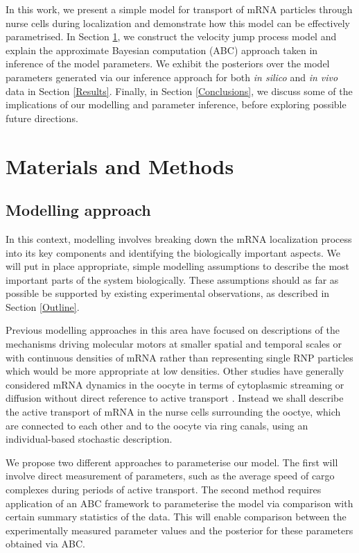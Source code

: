\documentclass[twocolumn]{biophys}
\begin{document}
In this work, we present a simple model for transport of mRNA particles through nurse cells during localization and demonstrate how this model can be effectively parametrised.
In Section \ref{Methods}, we construct the velocity jump process model and explain the approximate Bayesian computation (ABC) approach taken in inference of the model parameters.
We exhibit the posteriors over the model parameters generated via our inference approach for both \textit{in silico} and \textit{in vivo} data in Section \ref{Results}.
Finally, in Section \ref{Conclusions}, we discuss some of the implications of our modelling and parameter inference, before exploring possible future directions.

\section{Materials and Methods} \label{Methods}
\subsection{Modelling approach} \label{Modelling}
In this context, modelling involves breaking down the mRNA localization process into its key components and identifying the biologically important aspects. 
We will put in place appropriate, simple modelling assumptions to describe the most important parts of the system biologically.
These assumptions should as far as possible be supported by existing experimental observations, as described in Section \ref{Outline}.

Previous modelling approaches in this area have focused on descriptions of the mechanisms driving molecular motors at smaller spatial and temporal scales \citep{bressloff2013stochastic} or with continuous densities of mRNA \citep{szymanska2014mathematical} rather than representing single RNP particles which would be more appropriate at low densities.
Other studies have generally considered mRNA dynamics in the oocyte in terms of cytoplasmic streaming or diffusion without direct reference to active transport \citep{ganguly2012cytoplasmic, liu2011role}.
Instead we shall describe the active transport of mRNA in the nurse cells surrounding the ooctye, which are connected to each other and to the oocyte via ring canals, using an individual-based stochastic description.

We propose two different approaches to parameterise our model. 
The first will involve direct measurement of parameters, such as the average speed of cargo complexes during periods of active transport.
The second method requires application of an ABC framework \citep{johnston2014interpreting, turner2012tutorial, beaumont2002approximate} to parameterise the model via comparison with certain summary statistics of the data.
This will enable comparison between the experimentally measured parameter values and the posterior for these parameters obtained via ABC.
\end{document}
